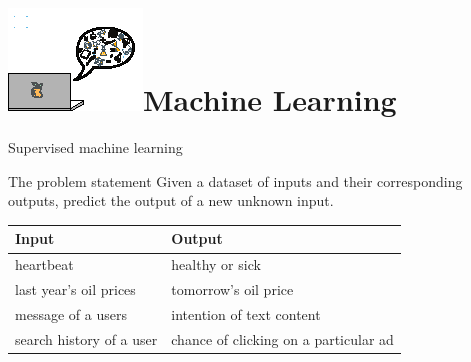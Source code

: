 \documentclass[10pt]{beamer}
\begin{document}
\section{\protect\includegraphics[scale=3.5]{Vectors/laptop_ml.eps}\newline Machine Learning
}

{
\begin{frame}[fragile]{Supervised machine learning}


\begin{exampleblock}{The problem statement}
Given a dataset of inputs and their corresponding outputs, predict the output of a new unknown input.
\end{exampleblock}


\vspace{1cm}
\begin{table}
\begin{tabular}{l  l }
\toprule
Input & Output\\\midrule
heartbeat & healthy or sick\\
last year's oil prices & tomorrow's oil price\\
message of a users & intention of text content\\
search history of a user & chance of clicking on a particular ad\\
\end{tabular}
\end{table}




\end{frame}}
\end{document}
